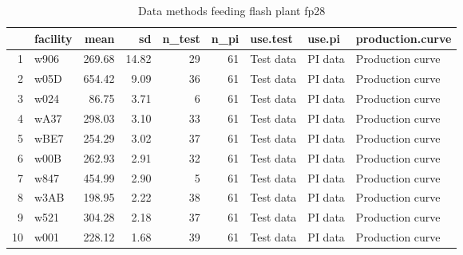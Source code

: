 \begin{table}[H]
\centering
\begin{tabular}{rlrrrrlll}
  \hline
 & facility & mean & sd & n\_test & n\_pi & use.test & use.pi & production.curve \\ 
  \hline
1 & w906 & 269.68 & 14.82 &  29 &  61 & Test data & PI data & Production curve \\ 
  2 & w05D & 654.42 & 9.09 &  36 &  61 & Test data & PI data & Production curve \\ 
  3 & w024 & 86.75 & 3.71 &   6 &  61 & Test data & PI data & Production curve \\ 
  4 & wA37 & 298.03 & 3.10 &  33 &  61 & Test data & PI data & Production curve \\ 
  5 & wBE7 & 254.29 & 3.02 &  37 &  61 & Test data & PI data & Production curve \\ 
  6 & w00B & 262.93 & 2.91 &  32 &  61 & Test data & PI data & Production curve \\ 
  7 & w847 & 454.99 & 2.90 &   5 &  61 & Test data & PI data & Production curve \\ 
  8 & w3AB & 198.95 & 2.22 &  38 &  61 & Test data & PI data & Production curve \\ 
  9 & w521 & 304.28 & 2.18 &  37 &  61 & Test data & PI data & Production curve \\ 
  10 & w001 & 228.12 & 1.68 &  39 &  61 & Test data & PI data & Production curve \\ 
   \hline
\end{tabular}
\caption{Data methods feeding flash plant fp28} 
\label{tab:well_summaries_fp16}
\end{table}
